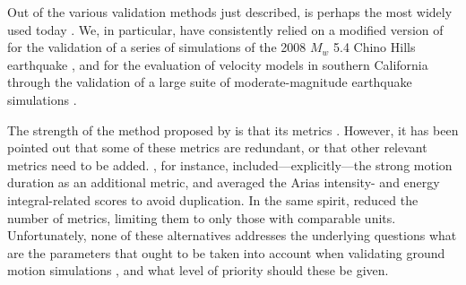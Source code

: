 Out of the various validation methods just described, \citet{Anderson_2004_Proc} is perhaps the most widely used today \citep[e.g.,][]{Chaljub_2010_BSSA, Bielak_2010_GJI, Guidotti_2011_SRL, Maufroy_2015_BSSA}. 
% 
We, in particular, have consistently relied on a modified version of  for the validation of a series of simulations of the 2008 $M_w$ 5.4 Chino Hills earthquake \citep{Taborda_2013_BSSA, Taborda_2014_BSSA}, and for the evaluation of velocity models in southern California through the validation of a large suite of moderate-magnitude earthquake simulations \citep{Taborda_2016_GJI}. 
% 
% 

The strength of the method proposed by \citet{Anderson_2004_Proc} is that its metrics . However, it has been pointed out that some of these metrics are redundant, or that other relevant metrics need to be added. \citet{Taborda_2013_BSSA}, for instance, included---explicitly---the strong motion duration \citep{Trifunac_1975_BSSA} as an additional metric, and averaged the Arias intensity- and energy integral-related scores to avoid duplication. In the same spirit, \citet{Maufroy_2015_BSSA} reduced the number of metrics, limiting them to only those with comparable units. Unfortunately, none of these alternatives addresses the underlying questions  what are the  parameters that ought to be taken into account when validating ground motion simulations , and what level of priority should these  be given.

